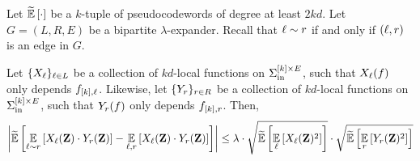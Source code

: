 \begin{lemma}\label{lem:eml_sos}
	Let $\tildeEx{\cdot}$ be a $k$-tuple of pseudocodewords of degree at least $2k d$. Let $G = (L,R,E)$ be a bipartite $\lambda$-expander. Recall that ${ \ell } \sim { r }$ if and only if $({ \ell },{ r })$ is an edge in $G$.
	
	Let $\{X_{{ \ell }}\}_{{ \ell } \in L}$ be a collection of $kd$-local functions on $\Sigma_{\mathrm{in}}^{[k]\times E}$, such that $X_{{ \ell }}(f)$ only depends $f_{[k],{ \ell }}$. Likewise, let $\{Y_{{ r }}\}_{{ r } \in R}$ be a collection of $kd$-local functions on $\Sigma_{\mathrm{in}}^{[k]\times E}$, such that $Y_{{ r }}(f)$ only depends $f_{[k],{ r }}$. 
	Then,
	\begin{align*}
		\abs*{\tildeEx{\Ex{\li\sim \ri}{X_{\li}(\zee) \cdot Y_{\ri}(\zee)} - \Ex{\li,\ri}{X_{\li}(\zee) \cdot Y_{\ri}(\zee)}}} \leq \lambda \cdot \sqrt{\tildeEx{\Ex{\li}{X_{\li}(\zee)^2}}} \cdot \sqrt{\tildeEx{\Ex{\ri}{Y_{\ri}(\zee)^2}}}
	\end{align*}
\end{lemma}
